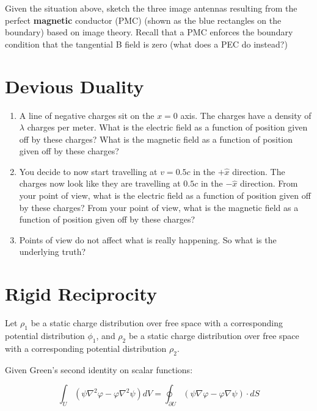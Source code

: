\documentclass{article}
\begin{document}
Given the situation above, sketch the three image antennas resulting from the perfect \textbf{magnetic} conductor (PMC) (shown as the blue rectangles on the boundary) based on image theory. Recall that a PMC enforces the boundary condition that the tangential B field is zero (what does a PEC do instead?)

\section{Devious Duality}

\begin{enumerate}[label=(\alph*)]
    \item A line of negative charges sit on the $x = 0$ axis. The charges have a density of $\lambda$ charges per meter. What is the electric field as a function of position given off by these charges? What is the magnetic field as a function of position given off by these charges?
    
    \item You decide to now start travelling at $v = 0.5c$ in the $+\hat{x}$ direction. The charges now look like they are travelling at $0.5c$ in the $-\hat{x}$ direction. From your point of view, what is the electric field as a function of position given off by these charges? From your point of view, what is the magnetic field as a function of position given off by these charges?
    
    \item Points of view do not affect what is really happening. So what is the underlying truth?

\end{enumerate}

\newpage

\section{Rigid Reciprocity}

Let $\rho_1$ be a static charge distribution over free space with a corresponding potential distribution $\phi_1$, and $\rho_2$ be a static charge distribution over free space with a corresponding potential distribution $\rho_2$. 

\vspace{3mm}

Given Green's second identity on scalar functions:

\[
\int_U (\psi\nabla^2\varphi - \varphi\nabla^2\psi) dV = \oint_{\partial U}(\psi\nabla\varphi - \varphi\nabla\psi)\cdot dS
\]
\end{document}
